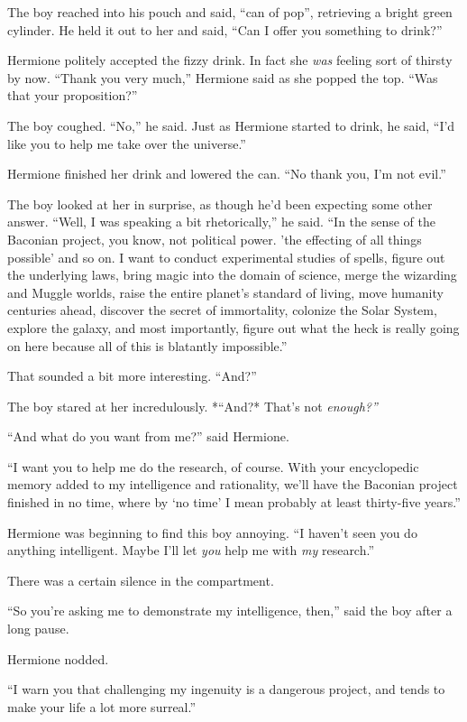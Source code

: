 The boy reached into his pouch and said, ``can of pop'', retrieving a
bright green cylinder. He held it out to her and said, ``Can I offer you
something to drink?''

Hermione politely accepted the fizzy drink. In fact she \emph{was}
feeling sort of thirsty by now. ``Thank you very much,'' Hermione said
as she popped the top. ``Was that your proposition?''

The boy coughed. ``No,'' he said. Just as Hermione started to drink, he
said, ``I'd like you to help me take over the universe.''

Hermione finished her drink and lowered the can. ``No thank you, I'm not
evil.''

The boy looked at her in surprise, as though he'd been expecting some
other answer. ``Well, I was speaking a bit rhetorically,'' he said. ``In
the sense of the Baconian project, you know, not political power. 'the
effecting of all things possible' and so on. I want to conduct
experimental studies of spells, figure out the underlying laws, bring
magic into the domain of science, merge the wizarding and Muggle worlds,
raise the entire planet's standard of living, move humanity centuries
ahead, discover the secret of immortality, colonize the Solar System,
explore the galaxy, and most importantly, figure out what the heck is
really going on here because all of this is blatantly impossible.''

That sounded a bit more interesting. ``And?''

The boy stared at her incredulously. *``And?* That's not
\emph{enough?''}

``And what do you want from me?'' said Hermione.

``I want you to help me do the research, of course. With your
encyclopedic memory added to my intelligence and rationality, we'll have
the Baconian project finished in no time, where by `no time' I mean
probably at least thirty-five years.''

Hermione was beginning to find this boy annoying. ``I haven't seen you
do anything intelligent. Maybe I'll let \emph{you} help me with
\emph{my} research.''

There was a certain silence in the compartment.

``So you're asking me to demonstrate my intelligence, then,'' said the
boy after a long pause.

Hermione nodded.

``I warn you that challenging my ingenuity is a dangerous project, and
tends to make your life a lot more surreal.''

